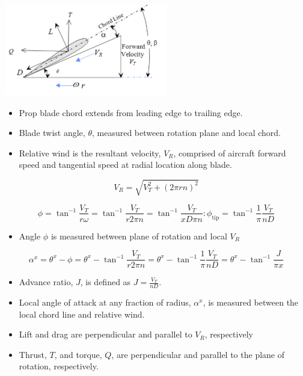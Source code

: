 \documentclass[
]{book}
\providecommand{\tightlist}{%
  \setlength{\itemsep}{0pt}\setlength{\parskip}{0pt}}
\begin{document}
\includegraphics[width=2.80139in,height=1.57292in]{media/11/image5.png}

\begin{itemize}
\tightlist
\item
  Prop blade chord extends from leading edge to trailing edge.
\item
  Blade twist angle, \(\theta\), measured between rotation plane and local chord.
\item
  Relative wind is the resultant velocity, \(V_R\), comprised of aircraft forward speed and tangential speed at radial location along blade.
\end{itemize}

\[
V_R = \sqrt{V_T^2 + \left( 2 \pi r n \right)^2}
\]

\[
\phi = \tan^{-1} \frac{V_T}{r \omega} = \tan^{-1} \frac{V_T}{r 2 \pi n} = \tan^{-1} \frac{V_T}{x D \pi n} : \phi_{\text{tip}} = \tan^{-1} \frac{1}{\pi} \frac{V_T}{nD}
\]

\begin{itemize}
\tightlist
\item
  Angle \(\phi\) is measured between plane of rotation and local \(V_R\)
\end{itemize}

\[
\alpha^x = \theta^x - \phi = \theta^x - \tan^{-1} \frac{V_T}{r 2 \pi n} = \theta^x - \tan^{-1} \frac{1}{\pi} \frac{V_T}{nD} = \theta^x - \tan^{-1} \frac{J}{\pi x}
\]

\begin{itemize}
\tightlist
\item
  Αdvance ratio, \(J\), is defined as \(J = \frac{V_T}{nD}\).
\item
  Local angle of attack at any fraction of radius, \(\alpha^x\), is measured between the local chord line and relative wind.
\item
  Lift and drag are perpendicular and parallel to \(V_R\), respectively
\item
  Thrust, \(T\), and torque, \(Q\), are perpendicular and parallel to the plane of rotation, respectively.
\end{itemize}
\end{document}
